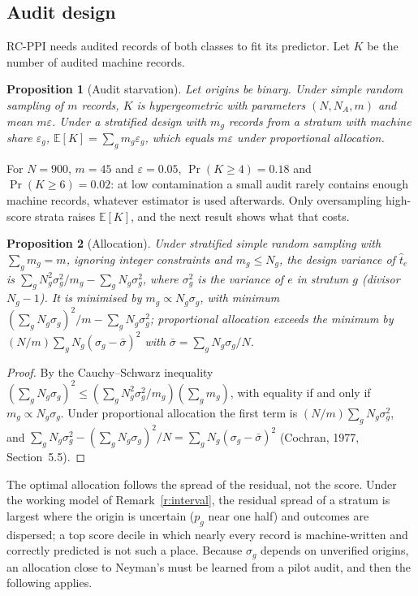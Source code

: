 \documentclass[11pt]{article}
\newtheorem{proposition}{Proposition}
\theoremstyle{definition}
\newcommand{\E}{\mathbb{E}}
\begin{document}
\subsection{Audit design}\label{sec:design-theory}
RC-PPI needs audited records of both classes to fit its predictor. Let $K$ be the number
of audited machine records.

\begin{proposition}[Audit starvation]\label{p:starve}
Let origins be binary. Under simple random sampling of $m$ records, $K$ is hypergeometric
with parameters $(N,N_A,m)$ and mean $m\varepsilon$. Under a stratified design with $m_g$
records from a stratum with machine share $\varepsilon_g$, $\E[K]=\sum_gm_g\varepsilon_g$,
which equals $m\varepsilon$ under proportional allocation.
\end{proposition}
For $N=900$, $m=45$ and $\varepsilon=0.05$, $\Pr(K\ge 4)=0.18$ and $\Pr(K\ge 6)=0.02$:
at low contamination a small audit rarely contains enough machine records, whatever
estimator is used afterwards. Only oversampling high-score strata raises $\E[K]$, and the
next result shows what that costs.

\begin{proposition}[Allocation]\label{p:neyman}
Under stratified simple random sampling with $\sum_gm_g=m$, ignoring integer constraints
and $m_g\le N_g$, the design variance of $\hat t_e$ is
$\sum_gN_g^2\sigma_g^2/m_g-\sum_gN_g\sigma_g^2$, where $\sigma_g^2$ is the variance of $e$ in
stratum $g$ (divisor $N_g-1$). It is minimised by $m_g\propto N_g\sigma_g$, with minimum
$(\sum_gN_g\sigma_g)^2/m-\sum_gN_g\sigma_g^2$; proportional allocation exceeds the minimum
by $(N/m)\sum_gN_g(\sigma_g-\bar\sigma)^2$ with $\bar\sigma=\sum_gN_g\sigma_g/N$.
\end{proposition}
\begin{proof}
By the Cauchy--Schwarz inequality
$(\sum_gN_g\sigma_g)^2\le(\sum_gN_g^2\sigma_g^2/m_g)(\sum_gm_g)$, with equality if and only if
$m_g\propto N_g\sigma_g$. Under proportional allocation the first term is
$(N/m)\sum_gN_g\sigma_g^2$, and
$\sum_gN_g\sigma_g^2-(\sum_gN_g\sigma_g)^2/N=\sum_gN_g(\sigma_g-\bar\sigma)^2$
(Cochran, 1977, Section~5.5).
\end{proof}
The optimal allocation follows the spread of the residual, not the score. Under the
working model of Remark~\ref{r:interval}, the residual spread of a stratum is largest where
the origin is uncertain ($p_g$ near one half) and outcomes are dispersed; a top score
decile in which nearly every record is machine-written and correctly predicted is not such
a place. Because $\sigma_g$ depends on unverified origins, an allocation close to Neyman's
must be learned from a pilot audit, and then the following applies.
\end{document}
